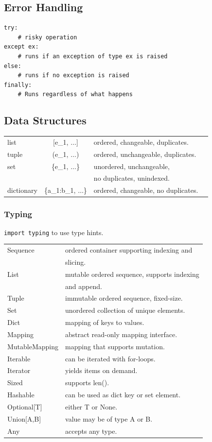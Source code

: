 \documentclass[5pt]{article}
\begin{document}
\begin{multicols}{2}
\subsection{Error Handling}
\begin{verbatim}
try:
    # risky operation
except ex:
    # runs if an exception of type ex is raised
else:
    # runs if no exception is raised
finally:
    # Runs regardless of what happens
\end{verbatim}

\subsection{Data Structures}
\begin{tabular}{LCLL}
    list          & [e\_1, $\dots$]         & ordered, changeable, duplicates.\\
    tuple         & (e\_1, $\dots$)         & ordered, unchangeable, duplicates.\\
    set           & \{e\_1, $\dots$\}       & unordered, unchangeable,\\
                  &                         & no duplicates, unindexed.\\
    dictionary    & \{a\_1:b\_1, $\dots$\}  & ordered, changeable, no duplicates.\\
\end{tabular}

\subsubsection{Typing}
\texttt{import typing} to use type hints.\\
\begin{tabular}{L L}
    Sequence      & ordered container supporting indexing and\\
                  & slicing.\\
    List          & mutable ordered sequence, supports indexing\\
                  & and append.\\
    Tuple         & immutable ordered sequence, fixed-size.\\
    Set           & unordered collection of unique elements.\\
    Dict          & mapping of keys to values.\\
    Mapping       & abstract read-only mapping interface.\\
    MutableMapping& mapping that supports mutation.\\
    Iterable      & can be iterated with for-loops.\\
    Iterator      & yields items on demand.\\
    Sized         & supports len().\\
    Hashable      & can be used as dict key or set element.\\
    Optional[T]   & either T or None.\\
    Union[A,B]    & value may be of type A or B.\\
    Any           & accepts any type.\\
\end{tabular}


\end{multicols}
\end{document}

